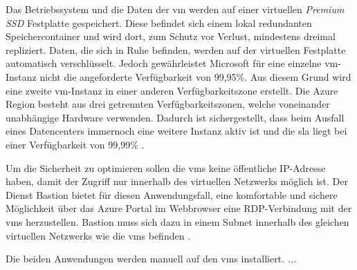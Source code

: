 Das Betriebssystem und die Daten der \ac{vm} werden auf einer virtuellen \textit{Premium SSD} Festplatte gespeichert. Diese befindet sich einem lokal redundanten Speichercontainer und wird dort, zum Schutz vor Verlust, mindestens dreimal repliziert. Daten, die sich in Ruhe befinden, werden auf der virtuellen Festplatte automatisch verschlüsselt. Jedoch gewährleistet Microsoft für eine einzelne \ac{vm}-Instanz nicht die angeforderte Verfügbarkeit von 99,95\%. Aus diesem Grund wird eine zweite \ac{vm}-Instanz in einer anderen Verfügbarkeitszone erstellt. Die Azure Region besteht aus drei getrennten Verfügbarkeitszonen, welche voneinander unabhängige Hardware verwenden. Dadurch ist sichergestellt, dass beim Ausfall eines Datencenters immernoch eine weitere Instanz aktiv ist und die \ac{sla} liegt bei einer Verfügbarkeit von 99,99\% \cite[vgl.][]{soh_data_2020}.

Um die Sicherheit zu optimieren sollen die \acp{vm} keine öffentliche IP-Adresse haben, damit der Zugriff nur innerhalb des virtuellen Netzwerks möglich ist. Der Dienst Bastion bietet für diesen Anwendungsfall, eine komfortable und sichere Möglichkeit über das Azure Portal im Webbrowser eine RDP-Verbindung mit der \acp{vm} herzustellen. Bastion muss sich dazu in einem Subnet innerhalb des gleichen virtuellen Netzwerks wie die \acp{vm} befinden \cite[vgl.][]{herath_azure_2022}.

Die beiden Anwendungen werden manuell auf den \acp{vm} installiert. \textit{...}